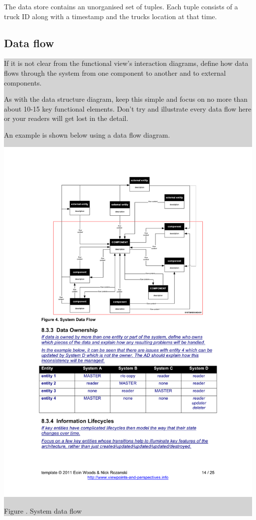 \documentclass[a4paper,11pt]{report}
\newcommand{\instructions}[1]{
  \noindent\colorbox{lightgray}{%
    \parbox{\linewidth}{%
      #1
    }%
  }%
 \vspace{0.1cm}
}
\newcommand{\mycaption}[1]{
  \addtocounter{figures}{1}
  Figure \arabic{figures}. #1
}
\begin{document}
The data store contains an unorganised set of tuples.  Each tuple
consists of a truck ID along with a timestamp and the trucks location
at that time.

\subsection{Data flow}
\label{sec:data-flow}

\instructions{
If it is not clear from the functional view’s interaction diagrams,
define how data flows through the system from one component to another
and to external components.

As with the data structure diagram, keep this simple and focus on no
more than about 10-15 key functional elements. Don’t try and
illustrate every data flow here or your readers will get lost in the
detail.

An example is shown below using a data flow diagram.

\begin{center}
  \includegraphics[width=\textwidth]{figures/systemdataflow}\\
  \mycaption{System data flow}
\end{center}
}
\end{document}
